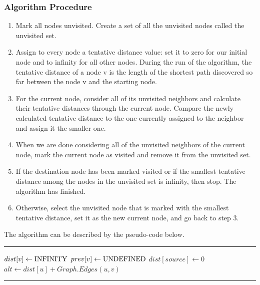 \documentclass[twoside]{article}
\makeatletter
\newenvironment{breakablealgorithm}
  {%
   \begin{center}
     \refstepcounter{algorithm}%
     \hrule height.8pt depth0pt \kern2pt%
     \renewcommand{\caption}[2][\relax]{%
       {\raggedright\textbf{\ALG@name~\thealgorithm} ##2\par}%
       \ifx\relax##1\relax %
         \addcontentsline{loa}{algorithm}{\protect\numberline{\thealgorithm}##2}%
       \else %
         \addcontentsline{loa}{algorithm}{\protect\numberline{\thealgorithm}##1}%
       \fi
       \kern2pt\hrule\kern2pt
     }
  }{%
     \kern2pt\hrule\relax%
   \end{center}
  }
\makeatother
\begin{document}
\begin{CJK*}{UTF8}{gbsn}
\subsubsection{Algorithm Procedure}
\begin{enumerate}
    \item Mark all nodes unvisited. Create a set of all the unvisited nodes called the unvisited set.
    \item Assign to every node a tentative distance value: set it to zero for our initial node and to infinity for all other nodes. During the run of the algorithm, the tentative distance of a node v is the length of the shortest path discovered so far between the node v and the starting node.
    \item For the current node, consider all of its unvisited neighbors and calculate their tentative distances through the current node. Compare the newly calculated tentative distance to the one currently assigned to the neighbor and assign it the smaller one.
    \item When we are done considering all of the unvisited neighbors of the current node, mark the current node as visited and remove it from the unvisited set.
    \item If the destination node has been marked visited or if the smallest tentative distance among the nodes in the unvisited set is infinity, then stop. The algorithm has finished.
    \item Otherwise, select the unvisited node that is marked with the smallest tentative distance, set it as the new current node, and go back to step 3.
\end{enumerate}
The algorithm can be described by the pseudo-code below.  
\begin{breakablealgorithm}
    \begin{algorithmic}[1] 
                    \State $dist[v]\leftarrow \rm{INFINITY}$
                    \State $prev[v]\leftarrow \rm{UNDEFINED}$
                \EndFor
        \State $dist[source]\leftarrow 0$
                \State $alt\leftarrow dist[u]+Graph.Edges(u, v)$
                \EndIf
            \EndFor
        \EndWhile
        \State {}
        \EndFunction
    \end{algorithmic}
\end{breakablealgorithm}


\end{CJK*}
\end{document}
